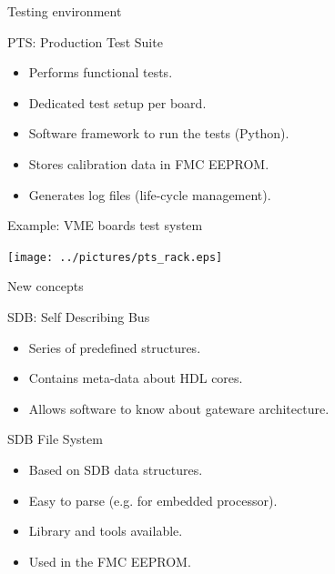 \documentclass[compress,red]{beamer}
\begin{document}
\begin{frame}{Testing environment}

  \begin{block}{PTS: Production Test Suite}
    \begin{itemize}
    \item Performs functional tests.
    \item Dedicated test setup per board.
    \item Software framework to run the tests (Python).
    \item Stores calibration data in FMC EEPROM.
    \item Generates log files (life-cycle management).
    \end{itemize}
  \end{block}



  \note[item]{}

\end{frame}

\begin{frame}{Example: VME boards test system}

  \begin{center}
    \texttt{[image: ../pictures/pts\_rack.eps]}
  \end{center}

  \note[item]{}

\end{frame}

\begin{frame}{New concepts}

  \pause
  \begin{block}{SDB: Self Describing Bus}
    \begin{itemize}
    \item Series of predefined structures.
    \item Contains meta-data about HDL cores.
    \item Allows software to know about gateware architecture.
    \end{itemize}
  \end{block}

  \pause
  \begin{block}{SDB File System}
    \begin{itemize}
    \item Based on SDB data structures.
    \item Easy to parse (e.g. for embedded processor).
    \item Library and tools available. %
    \item Used in the FMC EEPROM.
    \end{itemize}
  \end{block}

  \note[item]{}

\end{frame}
\end{document}
